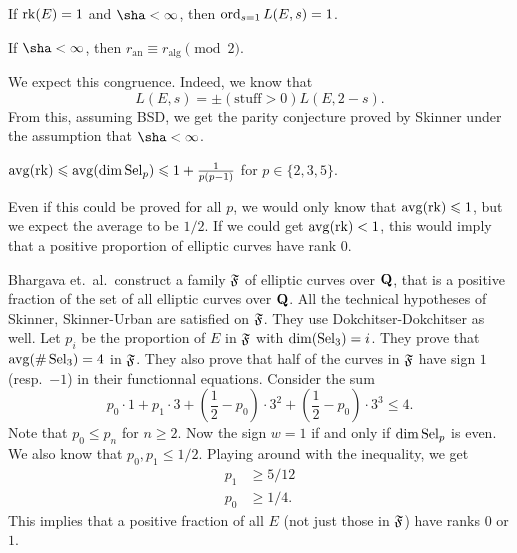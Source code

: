 \begin{theorem}[Skinner]
If $\operatorname{rk}(E)=1$ and $\sha<\infty$, then $\operatorname{ord}_{s=1} L(E,s)=1$. 
\end{theorem}

\begin{theorem}
If $\sha<\infty$, then $r_\mathrm{an}\equiv r_\mathrm{alg}\pmod 2$. 
\end{theorem}

We expect this congruence. Indeed, we know that 
\[
  L(E,s) = \pm(\text{stuff}>0)L(E,2-s).
\]
From this, assuming BSD, we get the parity conjecture proved by Skinner 
under the assumption that $\sha<\infty$. 

\begin{theorem}
$\operatorname{avg}(\operatorname{rk}) \leqslant \operatorname{avg}(\dim \operatorname{Sel}_p)\leqslant 1+\frac{1}{p(p-1)}$ 
for $p\in \{2,3,5\}$. 
\end{theorem}

Even if this could be proved for all $p$, we would only know that 
$\operatorname{avg}(\operatorname{rk}) \leqslant 1$, but we expect the average to be $1/2$. If we 
could get $\operatorname{avg}(\operatorname{rk})<1$, this would imply that a positive proportion of 
elliptic curves have rank $0$. 

Bhargava et.~al.~construct a family $\mathfrak{F}$ of elliptic curves over $\mathbf{Q}$, 
that is a positive fraction of the set of all elliptic curves over $\mathbf{Q}$. All 
the technical hypotheses of Skinner, Skinner-Urban are satisfied on $\mathfrak{F}$. They 
use Dokchitser-Dokchitser as well. Let $p_i$ be the proportion of $E$ in $\mathfrak{F}$ 
with $\dim(\operatorname{Sel}_3)=i$. They prove that $\operatorname{avg}(\#\operatorname{Sel}_3)=4$ in $\mathfrak{F}$. 
They also prove that half of the curves in $\mathfrak{F}$ have sign $1$ (resp.~$-1$) in 
their functionnal equations. Consider the sum 
\[
  p_0\cdot 1 + p_1\cdot 3 + \left(\frac 1 2-p_0\right)\cdot 3^2 + \left(\frac 1 2-p_0\right)\cdot 3^3 \leqslant 4.
\]
Note that $p_0\leqslant p_n$ for $n\geqslant 2$. Now the sign $w=1$ if 
and only if $\dim\operatorname{Sel}_p$ is even. We also know that $p_0,p_1\leqslant 1/2$. 
Playing around with the inequality, we get 
\begin{align*}
  p_1 &\geqslant 5/12 \\
  p_0 &\geqslant 1/4 .
\end{align*}
This implies that a positive fraction of all $E$ (not just those in $\mathfrak{F}$) have 
ranks $0$ or $1$. 








